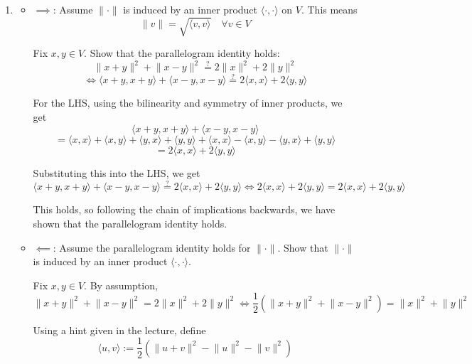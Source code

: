\documentclass[12pt]{article}
\begin{document}
\begin{enumerate}[label=\alph*)]
    \item
    \begin{itemize}
        \item \underline{$\implies$}: Assume $\lVert \cdot \rVert$ is induced by an inner product $\langle \cdot, \cdot \rangle$ on $V$. This means
        $$
            \lVert v \rVert = \sqrt{\langle v, v \rangle} \quad \forall v \in V
        $$

        Fix $x, y \in V$. Show that the parallelogram identity holds:
        $$
            \lVert x + y \rVert^2 + \lVert x - y \rVert^2 \overset{?}= 2 \lVert x \rVert^2 + 2 \lVert y \rVert^2
        $$
        $$
            \iff \langle x + y, x + y \rangle + \langle x-y, x-y \rangle \overset{?}= 2 \langle x, x \rangle + 2 \langle y, y \rangle
        $$

        For the LHS, using the bilinearity and symmetry of inner products, we get
        $$
            \langle x + y, x + y \rangle + \langle x-y, x-y \rangle  
        $$
        $$
            = \langle x, x \rangle + \langle x, y \rangle + \langle y, x \rangle + \langle y, y \rangle + \langle x, x \rangle - \langle x, y \rangle - \langle y, x \rangle + \langle y, y \rangle
        $$
        $$
            = 2 \langle x, x \rangle + 2 \langle y, y \rangle
        $$

        Substituting this into the LHS, we get
        $$
            \langle x + y, x + y \rangle + \langle x-y, x-y \rangle \overset{?}= 2 \langle x, x \rangle + 2 \langle y, y \rangle \iff 2 \langle x, x \rangle + 2 \langle y, y \rangle = 2 \langle x, x \rangle + 2 \langle y, y \rangle
        $$

        This holds, so following the chain of implications backwards, we have shown that the parallelogram identity holds.

        \item \underline{$\impliedby$}: Assume the parallelogram identity holds for $\lVert \cdot \rVert$. Show that $\lVert \cdot \rVert$ is induced by an inner product $\langle \cdot, \cdot \rangle$.
        
        Fix $x, y \in V$. By assumption,
        $$
            \lVert x + y \rVert^2 + \lVert x - y \rVert^2 = 2 \lVert x \rVert^2 + 2 \lVert y \rVert^2 \iff \frac{1}{2}\left(\lVert x + y \rVert^2 + \lVert x - y \rVert^2\right) = \lVert x \rVert^2 + \lVert y \rVert^2
        $$

        Using a hint given in the lecture, define
        $$
            \langle u, v \rangle := \frac{1}{2}\left(\lVert u + v \rVert^2 - \lVert u \rVert^2 - \lVert v \rVert^2\right)
        $$


\end{itemize}
\end{enumerate}
\end{document}
